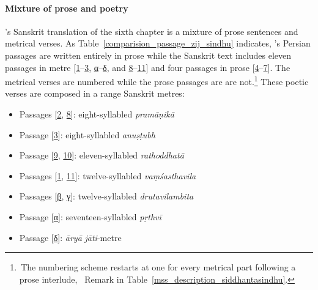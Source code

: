 \paragraph{Mixture of prose and poetry}\label{prose_poetry_siddhantasindhu_chapter_six}
\Nityananda's Sanskrit translation of the sixth chapter is a mixture of prose sentences and metrical verses. As Table~\ref{comparision_passage_zij_sindhu} indicates, \MullaFarid's Persian passages are written entirely in prose while the Sanskrit text includes eleven passages in metre [\hyperlink{Spass1}{1}--\hyperlink{Spass3}{3}, \hyperlink{SpassA}{α}--\hyperlink{SpassD}{δ}, and \hyperlink{Spass8}{8}--\hyperlink{Spass11}{11}] and four passages in prose [\hyperlink{Spass4}{4}--\hyperlink{Spass7}{7}]. The metrical verses are numbered while the prose passages are are not.\footnote{\,The numbering scheme restarts at one for every metrical part following a prose interlude, \vid\ Remark in Table~\ref{mss_description_siddhantasindhu}.} These poetic verses are composed in a range Sanskrit metres:
\begin{itemize}[topsep=0pt]
    \item Passages [\hyperlink{Spass2}{2}, \hyperlink{Spass8}{8}]: eight-syllabled \textit{pramāṇikā}
    \item Passage [\hyperlink{Spass3}{3}]: eight-syllabled \textit{anuṣṭubh}
    \item Passage [\hyperlink{Spass9}{9}, \hyperlink{Spass10}{10}]: eleven-syllabled \textit{rathoddhatā}
    \item Passages [\hyperlink{Spass1}{1}, \hyperlink{Spass11}{11}]: twelve-syllabled \textit{vaṃśasthavila}
    \item Passages [\hyperlink{SpassB}{β}, \hyperlink{SpassC}{γ}]: twelve-syllabled \textit{drutavilambita}
    \item Passage [\hyperlink{SpassA}{α}]: seventeen-syllabled \textit{pṛthvī}
    \item Passage [\hyperlink{SpassD}{δ}]: \textit{āryā} \textit{jāti}-metre
\end{itemize}

